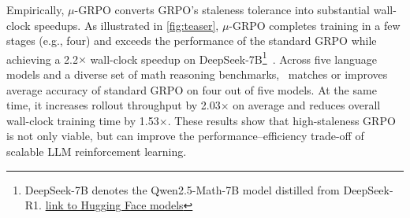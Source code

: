 Empirically, $\mu$-GRPO converts GRPO's staleness tolerance into substantial wall-clock speedups. As illustrated in \cref{fig:teaser}, $\mu$-GRPO completes training in a few stages (e.g., four) and exceeds the performance of the standard GRPO while achieving a 2.2$\times$ wall-clock speedup on DeepSeek-7B\footnote{
DeepSeek-7B denotes the Qwen2.5-Math-7B model distilled from DeepSeek-R1.
\href{https://huggingface.co/deepseek-ai/DeepSeek-R1-Distill-Qwen-7B}{link to Hugging Face models}}~\cite{shao2024deepseekmathpushinglimitsmathematical}. Across five language models and a diverse set of math reasoning benchmarks, \ourmethod \ matches or improves average accuracy of standard GRPO on four out of five models. At the same time, it increases rollout throughput by 2.03$\times$ on average and reduces overall wall-clock training time by 1.53$\times$. These results show that high-staleness GRPO is not only viable, but can improve the performance--efficiency trade-off of scalable LLM reinforcement learning.

 
    
    

